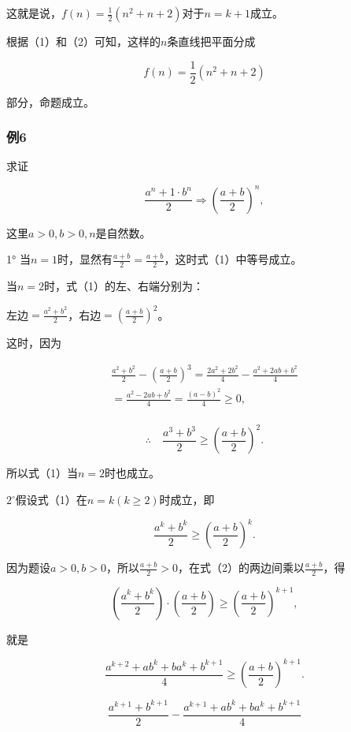 这就是说，\(f(n) = \frac{1}{2} (n^2 + n + 2)\)对于\(n = k + 1\)成立。

根据（1）和（2）可知，这样的\(n\)条直线把平面分成

\[
f (n) = \frac{1}{2} (n^{2} + n + 2)
\]

部分，命题成立。

\subsubsection{例6}

求证

\[
\frac{a^{n} + 1 \cdot b^{n}}{2} \Rightarrow \left(\frac{a + b}{2}\right)^{n}, \tag {1}
\]

这里\(a > 0, b > 0, n\)是自然数。

 1°
当\(n = 1\)时，显然有\(\frac{a + b}{2} = \frac{a + b}{2}\)，这时式（1）中等号成立。

当\(n = 2\)时，式（1）的左、右端分别为：

左边\(= \frac{a^2 + b^2}{2}\)，右边\(= \left(\frac{a + b}{2}\right)^2\)。

这时，因为

\[
\begin{array}{l} \frac{a^{2} + b^{2}}{2} - \left(\frac{a + b}{2}\right)^{3} = \frac{2 a^{2} + 2 b^{2}}{4} - \frac{a^{2} + 2 a b + b^{2}}{4} \\ = \frac{a^{2} - 2 a b + b^{2}}{4} = \frac{(a - b)^{2}}{4} \geqslant 0, \\ \end{array}
\]

\[
\therefore \quad \frac{a^{3} + b^{3}}{2} \geqslant \left(\frac{a + b}{2}\right)^{2}.
\]

所以式（1）当\(n = 2\)时也成立。

\(2^{\circ}\)假设式（1）在\(n = k (k \geqslant 2)\)时成立，即

\[
\frac{a^{k} + b^{k}}{2} \geqslant \left(\frac{a + b}{2}\right)^{k}. \tag {2}
\]

因为题设\(a > 0, b > 0\)，所以\(\frac{a + b}{2} > 0\)，在式（2）的两边间乘以\(\frac{a + b}{2}\)，得

\[
\left(\frac{a^{k} + b^{k}}{2}\right) \cdot \left(\frac{a + b}{2}\right) \geqslant \left(\frac{a + b}{2}\right)^{k + 1},
\]

就是

\[
\frac{a^{k + 2} + a b^{k} + b a^{k} + b^{k + 1}}{4} \geqslant \left(\frac{a + b}{2}\right)^{k + 1}. \tag {3}
\]

\[
\frac{a^{k + 1} + b^{k + 1}}{2} - \frac{a^{k + 1} + a b^{k} + b a^{k} + b^{k + 1}}{4}
\]

